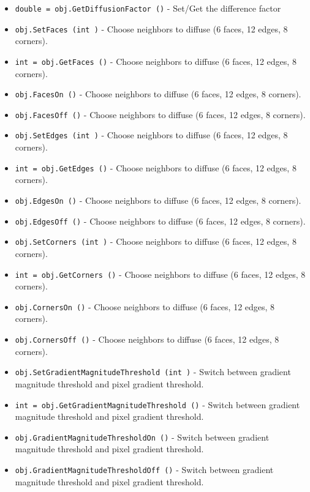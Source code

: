 \begin{itemize}
\item  \verb|double = obj.GetDiffusionFactor ()| -  Set/Get the difference factor

\item  \verb|obj.SetFaces (int )| -  Choose neighbors to diffuse (6 faces, 12 edges, 8 corners).

\item  \verb|int = obj.GetFaces ()| -  Choose neighbors to diffuse (6 faces, 12 edges, 8 corners).

\item  \verb|obj.FacesOn ()| -  Choose neighbors to diffuse (6 faces, 12 edges, 8 corners).

\item  \verb|obj.FacesOff ()| -  Choose neighbors to diffuse (6 faces, 12 edges, 8 corners).

\item  \verb|obj.SetEdges (int )| -  Choose neighbors to diffuse (6 faces, 12 edges, 8 corners).

\item  \verb|int = obj.GetEdges ()| -  Choose neighbors to diffuse (6 faces, 12 edges, 8 corners).

\item  \verb|obj.EdgesOn ()| -  Choose neighbors to diffuse (6 faces, 12 edges, 8 corners).

\item  \verb|obj.EdgesOff ()| -  Choose neighbors to diffuse (6 faces, 12 edges, 8 corners).

\item  \verb|obj.SetCorners (int )| -  Choose neighbors to diffuse (6 faces, 12 edges, 8 corners).

\item  \verb|int = obj.GetCorners ()| -  Choose neighbors to diffuse (6 faces, 12 edges, 8 corners).

\item  \verb|obj.CornersOn ()| -  Choose neighbors to diffuse (6 faces, 12 edges, 8 corners).

\item  \verb|obj.CornersOff ()| -  Choose neighbors to diffuse (6 faces, 12 edges, 8 corners).

\item  \verb|obj.SetGradientMagnitudeThreshold (int )| -  Switch between gradient magnitude threshold and pixel gradient threshold.

\item  \verb|int = obj.GetGradientMagnitudeThreshold ()| -  Switch between gradient magnitude threshold and pixel gradient threshold.

\item  \verb|obj.GradientMagnitudeThresholdOn ()| -  Switch between gradient magnitude threshold and pixel gradient threshold.

\item  \verb|obj.GradientMagnitudeThresholdOff ()| -  Switch between gradient magnitude threshold and pixel gradient threshold.

\end{itemize}
